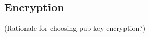 \subsection{Encryption}
\label{sec:math_encryption}

(Rationale for choosing pub-key encryption?)


